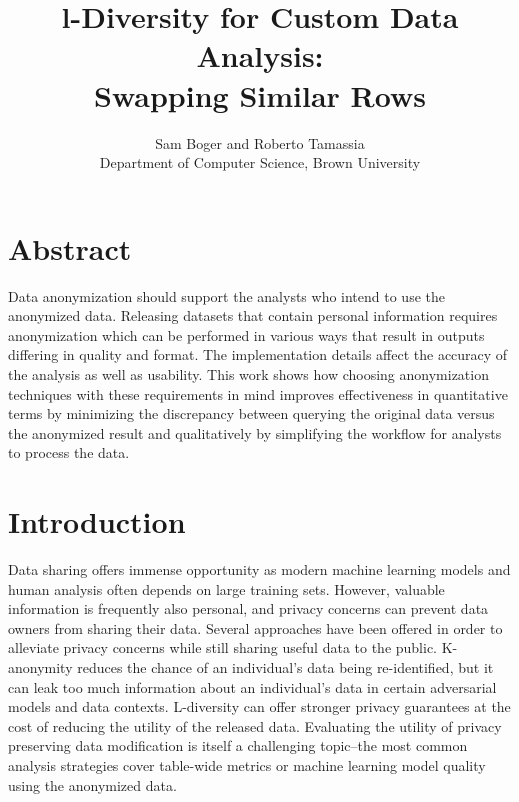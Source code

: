 

\date{}

\title{\Large \bf l-Diversity for Custom Data Analysis:\\
  Swapping Similar Rows}

\author{
{\rm Sam Boger and Roberto Tamassia} \\
Department of Computer Science, Brown University

} %

\maketitle
\section{Abstract}
Data anonymization should support the analysts who intend to use the anonymized data. Releasing datasets that contain personal information requires anonymization which can be performed in various ways that result in outputs differing in quality and format. The implementation details affect the accuracy of the analysis as well as usability. This work shows how choosing anonymization techniques with these requirements in mind improves effectiveness in quantitative terms by minimizing the discrepancy between querying the original data versus the anonymized result and qualitatively by simplifying the workflow for analysts to process the data.

\section{Introduction}
Data sharing offers immense opportunity as modern machine learning models and human analysis often depends on large training sets. However, valuable information is frequently also personal, and privacy concerns can prevent data owners from sharing their data. Several approaches have been offered in order to alleviate privacy concerns while still sharing useful data to the public. K-anonymity reduces the chance of an individual’s data being re-identified, but it can leak too much information about an individual's data in certain adversarial models and data contexts. L-diversity can offer stronger privacy guarantees at the cost of reducing the utility of the released data. Evaluating the utility of privacy preserving data modification is itself a challenging topic--the most common analysis strategies cover table-wide metrics or machine learning model quality using the anonymized data.

